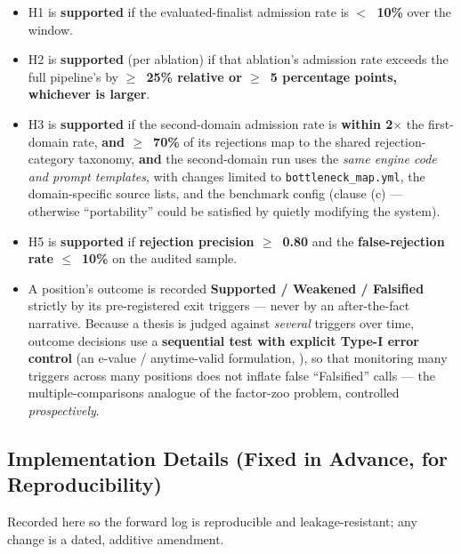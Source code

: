 \documentclass[11pt]{article}
\begin{document}
\begin{itemize}
  \item H1 is \textbf{supported} if the evaluated-finalist admission rate is \textbf{$<$~10\%}
    over the window.
  \item H2 is \textbf{supported} (per ablation) if that ablation's admission rate exceeds the
    full pipeline's by \textbf{$\geq$~25\% relative or $\geq$~5 percentage points, whichever is
    larger}.
  \item H3 is \textbf{supported} if the second-domain admission rate is \textbf{within
    2$\times$} the first-domain rate, \textbf{and $\geq$~70\%} of its rejections map to the shared
    rejection-category taxonomy, \textbf{and} the second-domain run uses the \emph{same engine code
    and prompt templates}, with changes limited to \texttt{bottleneck\_map.yml}, the domain-specific
    source lists, and the benchmark config (clause (c) --- otherwise ``portability'' could be
    satisfied by quietly modifying the system).
  \item H5 is \textbf{supported} if \textbf{rejection precision $\geq$~0.80} and the
    \textbf{false-rejection rate $\leq$~10\%} on the audited sample.
  \item A position's outcome is recorded \textbf{Supported / Weakened / Falsified} strictly by
    its pre-registered exit triggers --- never by an after-the-fact narrative. Because a thesis is
    judged against \emph{several} triggers over time, outcome decisions use a \textbf{sequential
    test with explicit Type-I error control} (an e-value / anytime-valid formulation,
    \citep{huang2025popper}), so that monitoring many triggers across many positions does not
    inflate false ``Falsified'' calls --- the multiple-comparisons analogue of the factor-zoo
    problem, controlled \emph{prospectively}.
\end{itemize}

\subsection*{Implementation Details (Fixed in Advance, for Reproducibility)}

Recorded here so the forward log is reproducible and leakage-resistant; any change is a dated,
additive amendment.
\end{document}

